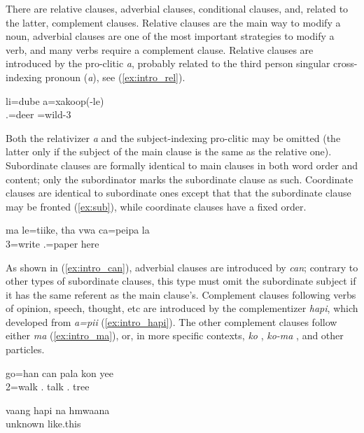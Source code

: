 There are relative clauses, adverbial clauses, conditional clauses, and, related to the latter, complement clauses. Relative clauses are the main way to modify a noun, adverbial clauses are one of the most important strategies to modify a verb, and many verbs require a complement clause. Relative clauses are introduced by the pro-clitic \textit{a}, probably related to the third person singular cross-indexing pronoun (\textit{a}), see (\ref{ex:intro_rel}). 

\ea \label{ex:intro_rel}
\gll li=dube a=xakoop(-le)\\
 .=deer =wild-3\\
\glt {}
\z

Both the relativizer \textit{a} and the subject-indexing pro-clitic may be omitted (the latter only if the subject of the main clause is the same as the relative one). Subordinate clauses are formally identical to main clauses in both word order and content; only the subordinator marks the subordinate clause as such. Coordinate clauses are identical to subordinate ones except that that the subordinate clause may be fronted (\ref{ex:sub}), while coordinate clauses have a fixed order.

\ea \label{ex:sub}
\gll {\ob}ma le=tiike{\cb}, tha vwa ca=peipa la\\
  3=write   .=paper here\\
\glt {}
\z

As shown in (\ref{ex:intro_can}), adverbial clauses are introduced by \textit{can}; contrary to other types of subordinate clauses, this type must omit the subordinate subject if it has the same referent as the main clause's. Complement clauses following verbs of opinion, speech, thought, etc are introduced by the complementizer \textit{hapi}, which developed from \textit{a=pii}  (\ref{ex:intro_hapi}). The other complement clauses follow either \textit{ma}  (\ref{ex:intro_ma}), or, in more specific contexts, \textit{ko} , \textit{ko-ma} , and other particles. 


\ea\label{ex:intro_can}
\gll go=han {\ob}can pala kon yee{\cb}\\
 2=walk  . talk . tree\\
\glt {}
\z

\ea\label{ex:intro_hapi}
\gll vaang {\ob}hapi na hmwaana{\cb}\\
 unknown   like.this\\
\glt {}
\z


